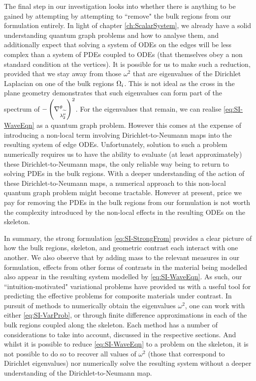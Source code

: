 The final step in our investigation looks into whether there is anything to be gained by attempting by attempting to ``remove" the bulk regions from our formulation entirely.
In light of chapter \ref{ch:ScalarSystem}, we already have a solid understanding quantum graph problems and how to analyse them, and additionally expect that solving a system of ODEs on the edges will be less complex than a system of PDEs coupled to ODEs (that themselves obey a non standard condition at the vertices).
It is possible for us to make such a reduction, provided that we stay away from those $\omega^2$ that are eigenvalues of the Dirichlet Laplacian on one of the bulk regions $\Omega_i$.
This is not ideal as the cross in the plane geometry demonstrates that such eigenvalues can form part of the spectrum of $-\left( \nabla^{\theta}_{\lambda_2^{\widetilde{\mu}}} \right)^2$.
For the eigenvalues that remain, we can realise \eqref{eq:SI-WaveEqn} as a quantum graph problem.
However this comes at the expense of introducing a non-local term involving Dirichlet-to-Neumann maps into the resulting system of edge ODEs.
Unfortunately, solution to such a problem numerically requires us to have the ability to evaluate (at least approximately) these Dirichlet-to-Neumann maps, the only reliable way being to return to solving PDEs in the bulk regions.
With a deeper understanding of the action of these Dirichlet-to-Neumann maps, a numerical approach to this non-local quantum graph problem might become tractable.
However at present, price we pay for removing the PDEs in the bulk regions from our formulation is not worth the complexity introduced by the non-local effects in the resulting ODEs on the skeleton.

In summary, the strong formulation \eqref{eq:SI-StrongFrom} provides a clear picture of how the bulk regions, skeleton, and geometric contrast each interact with one another.
We also observe that by adding mass to the relevant measures in our formulation, effects from other forms of contrasts in the material being modelled also appear in the resulting system modelled by \eqref{eq:SI-WaveEqn}.
As such, our ``intuition-motivated" variational problems have provided us with a useful tool for predicting the effective problems for composite materials under contrast.
In pursuit of methods to numerically obtain the eigenvalues $\omega^2$, one can work with either \eqref{eq:SI-VarProb}, or through finite difference approximations in each of the bulk regions coupled along the skeleton.
Each method has a number of considerations to take into account, discussed in the respective sections.
And whilst it is possible to reduce \eqref{eq:SI-WaveEqn} to a problem on the skeleton, it is not possible to do so to recover all values of $\omega^2$ (those that correspond to Dirichlet eigenvalues) nor numerically solve the resulting system without a deeper understanding of the Dirichlet-to-Neumann map.

